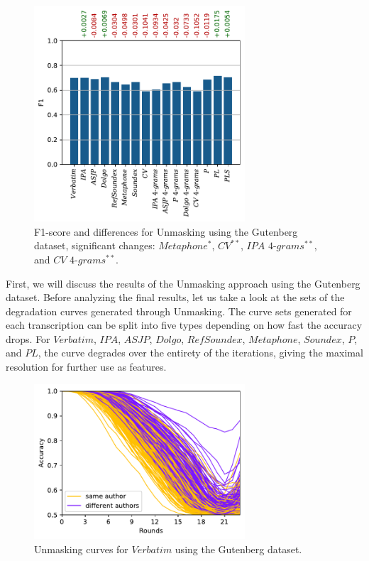 \begin{figure}
  \centering
  \includegraphics[width=0.7\textwidth]{figures/results_f1_gb_unmasking}
  \caption{F1-score and differences for Unmasking using the Gutenberg dataset, significant changes: $Metaphone^{*}$, $CV^{*\! *}$, $IPA$ $4$-$grams^{*\! *}$, and $CV$ $4$-$grams^{*\! *}$.}
  \label{fig:results_f1_gb_unmasking}
\end{figure}
First, we will discuss the results of the Unmasking approach using the Gutenberg dataset.
Before analyzing the final results, let us take a look at the sets of the degradation curves generated through Unmasking.
The curve sets generated for each transcription can be split into five types depending on how fast the accuracy drops. %
For $Verbatim$, $IPA$, $ASJP$, $Dolgo$, $RefSoundex$, $Metaphone$, $Soundex$, $P$, and $PL$, the curve degrades over the entirety of the iterations, giving the maximal resolution for further use as features.
\begin{figure}
  \centering
  \includegraphics[width=0.7\textwidth]{figures/verbatim_curves}
  \caption{Unmasking curves for $Verbatim$ using the Gutenberg dataset.}
  \label{fig:verbatim_curves}
\end{figure}
